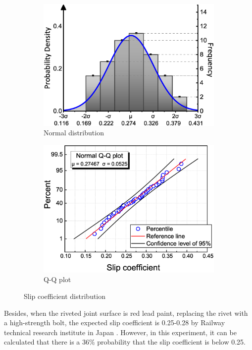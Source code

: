 \begin{figure}[htbp]
    \centering
    \begin{subfigure}[t]{0.48\textwidth}
    \includegraphics[width=\linewidth]{imgs/ch3/fig10a.eps}
    \caption{Normal distribution}
    \label{ch3fig10a}  
    \end{subfigure}
    \hfill
    \begin{subfigure}[t]{0.48\textwidth}
    \includegraphics[width=\linewidth]{imgs/ch3/fig10b.eps}
    \caption{Q-Q plot}
    \label{ch3fig10b}  
    \end{subfigure}
    \caption{Slip coefficient distribution}
    \label{ch3fig10} 
\end{figure}

Besides, when the riveted joint surface is red lead paint, replacing the rivet with a high-strength bolt, the expected slip coefficient is 0.25-0.28 by Railway technical research institute in Japan \cite{rtri1992Manual}. However, in this experiment, it can be calculated that there is a 36\% probability that the slip coefficient is below 0.25. 

